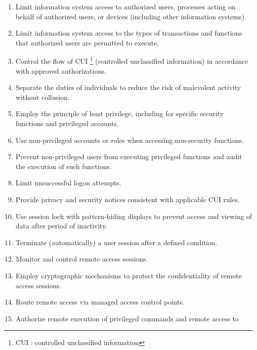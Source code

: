 \documentclass{article}
\begin{document}
                 \begin{enumerate}
                    \item Limit information system access to authorized users, processes acting on
                    behalf of authorized users, or devices (including other information systems).
                    \item Limit information system access to the types of transactions and functions
                    that authorized users are permitted to execute.
                    \item Control the flow of CUI \footnote{CUI : controlled
                    unclassified
                    information} (controlled unclassified information) in accordance
                    with approved authorizations.
                    \item Separate the duties of individuals to reduce the risk of malevolent activity
                    without collusion.
                    \item Employ the principle of least privilege, including for specific security functions
                    and privileged accounts.
                    \item Use non-privileged accounts or roles when accessing non-security functions.
                    \item Prevent non-privileged users from executing privileged functions and audit
                    the execution of such functions.
                    \item Limit unsuccessful logon attempts.
                    \item Provide privacy and security notices consistent with applicable CUI rules.
                    \item Use session lock with pattern-hiding displays to prevent access and viewing of
                    data after period of inactivity.
                    \item Terminate (automatically) a user session after a defined condition.
                    \item Monitor and control remote access sessions.
                    \item Employ cryptographic mechanisms to protect the confidentiality of remote
                    access sessions.
                    \item Route remote access via managed access control points.
                    \item Authorize remote execution of privileged commands and remote access to

\end{enumerate}
\end{document}
